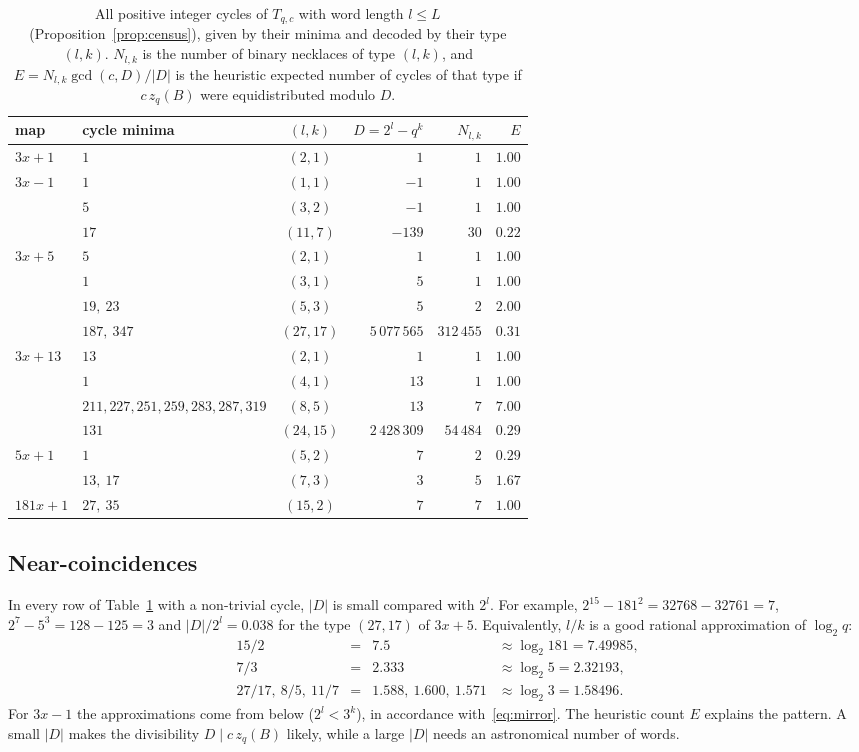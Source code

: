 \documentclass[12pt]{amsart}
\theoremstyle{definition}
\theoremstyle{remark}
\begin{document}
\begin{table}[H]
\centering
\small
\begin{tabular}{llcrrr}
\toprule
map & cycle minima & $(l,k)$ & $D=2^l-q^k$ & $N_{l,k}$ & $E$ \\
\midrule
$3x+1$ & $1$ & $(2,1)$ & $1$ & $1$ & $1.00$ \\
\midrule
$3x-1$ & $1$ & $(1,1)$ & $-1$ & $1$ & $1.00$ \\
 & $5$ & $(3,2)$ & $-1$ & $1$ & $1.00$ \\
 & $17$ & $(11,7)$ & $-139$ & $30$ & $0.22$ \\
\midrule
$3x+5$ & $5$ & $(2,1)$ & $1$ & $1$ & $1.00$ \\
 & $1$ & $(3,1)$ & $5$ & $1$ & $1.00$ \\
 & $19,\ 23$ & $(5,3)$ & $5$ & $2$ & $2.00$ \\
 & $187,\ 347$ & $(27,17)$ & $5\,077\,565$ & $312\,455$ & $0.31$ \\
\midrule
$3x+13$ & $13$ & $(2,1)$ & $1$ & $1$ & $1.00$ \\
 & $1$ & $(4,1)$ & $13$ & $1$ & $1.00$ \\
 & $211,227,251,259,283,287,319$ & $(8,5)$ & $13$ & $7$ & $7.00$ \\
 & $131$ & $(24,15)$ & $2\,428\,309$ & $54\,484$ & $0.29$ \\
\midrule
$5x+1$ & $1$ & $(5,2)$ & $7$ & $2$ & $0.29$ \\
 & $13,\ 17$ & $(7,3)$ & $3$ & $5$ & $1.67$ \\
\midrule
$181x+1$ & $27,\ 35$ & $(15,2)$ & $7$ & $7$ & $1.00$ \\
\bottomrule
\end{tabular}
\caption{All positive integer cycles of $T_{q,c}$ with word length $l\le L$ (Proposition~\ref{prop:census}), given by their minima and decoded by their type $(l,k)$. $N_{l,k}$ is the number of binary necklaces of type $(l,k)$, and $E=N_{l,k}\gcd(c,D)/|D|$ is the heuristic expected number of cycles of that type if $c\,z_q(B)$ were equidistributed modulo $D$.}
\label{table:zoo}
\end{table}


\subsection*{Near-coincidences}
In every row of Table~\ref{table:zoo} with a non-trivial cycle, $|D|$ is small compared with $2^l$. For example, $2^{15}-181^2=32768-32761=7$, $2^7-5^3=128-125=3$ and $|D|/2^l=0.038$ for the type $(27,17)$ of $3x+5$. Equivalently, $l/k$ is a good rational approximation of $\log_2 q$:
\[
\begin{array}{rcll}
15/2 &=& 7.5 & \approx \log_2 181 = 7.49985,\\
7/3 &=& 2.333 & \approx \log_2 5 = 2.32193,\\
27/17,\ 8/5,\ 11/7 &=& 1.588,\ 1.600,\ 1.571 & \approx \log_2 3 = 1.58496 .
\end{array}
\]
For $3x-1$ the approximations come from below ($2^l<3^k$), in accordance with~\eqref{eq:mirror}. The heuristic count $E$ explains the pattern. A small $|D|$ makes the divisibility $D\mid c\,z_q(B)$ likely, while a large $|D|$ needs an astronomical number of words.
\end{document}
